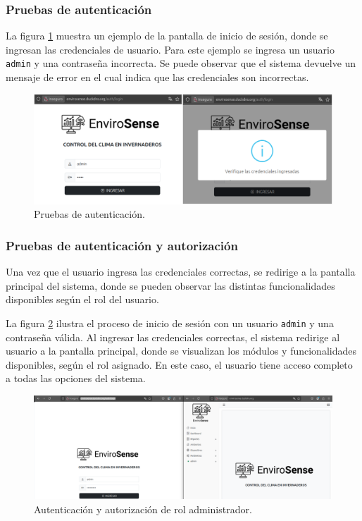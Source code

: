 \subsubsection{Pruebas de autenticación}

La figura \ref{fig:login} muestra un ejemplo de la pantalla de inicio de
sesión, donde se ingresan las credenciales de usuario. Para este ejemplo se
ingresa un usuario \texttt{admin} y una contraseña incorrecta. Se puede
observar que el sistema devuelve un mensaje de error en el cual indica que las
credenciales son incorrectas.

\begin{figure}[H]
    \centering
    \includegraphics[width=\textwidth]{Images/41_intento_login.png}
    \caption[Pruebas de autenticación]{Pruebas de autenticación.}
    \label{fig:login}
\end{figure}

\subsubsection{Pruebas de autenticación y autorización}
Una vez que el usuario ingresa las credenciales correctas, se redirige a la
pantalla principal del sistema, donde se pueden observar las distintas
funcionalidades disponibles según el rol del usuario.

La figura \ref{fig:login_correcto_admin} ilustra el proceso de inicio de sesión
con un usuario \texttt{admin} y una contraseña válida. Al ingresar las
credenciales correctas, el sistema redirige al usuario a la pantalla principal,
donde se visualizan los módulos y funcionalidades disponibles, según el rol
asignado. En este caso, el usuario tiene acceso completo a todas las opciones
del sistema.

\begin{figure}[H]
    \centering
    \includegraphics[width=\textwidth]{Images/42_login_correcto_admin.png}
    \caption[Autenticación y autorización rol administrador]{Autenticación y autorización de rol administrador.}
    \label{fig:login_correcto_admin}
\end{figure}

